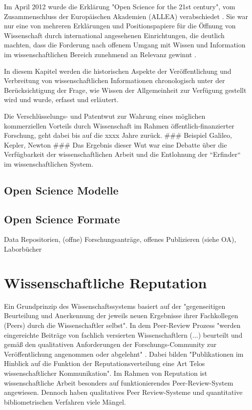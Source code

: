 Im April 2012 wurde die Erklärung "Open Science for the 21st century", vom Zusammenschluss der Europäischen Akademien (ALLEA) verabschiedet \cite{ALLEA_2012}. Sie war nur eine von mehreren Erklärungen und Positionspapiere für die Öffnung von Wissenschaft durch international angesehenen Einrichtungen, die deutlich machten, dass die Forderung nach offenem Umgang mit Wissen und Information im wissenschaftlichen Bereich zunehmend an Relevanz gewinnt \cite{schulze_2013_open}.

In diesem Kapitel werden die historischen Aspekte der Veröffentlichung und Verbreitung von wissenschaftlichen Informationen chronologisch unter der Berücksichtigung der Frage, wie Wissen der Allgemeinheit zur Verfügung gestellt wird und wurde, erfasst und erläutert. 

Die Verschlüsselungs- und Patentwut zur Wahrung eines möglichen kommerziellen Vorteils durch Wissenschaft im Rahmen öffentlich-finanzierter Forschung, geht dabei bis auf die xxxx Jahre zurück. ### Beispiel Galileo, Kepler, Newton ### Das Ergebnis dieser Wut war eine Debatte über die Verfügbarkeit der wissenschaftlichen Arbeit und die Entlohnung der “Erfinder“ im wissenschaftlichen System. 
\subsection{Open Science Modelle}
\subsection{Open Science Formate}
Data Repositorien, (offne) Forschungsanträge, offenes Publizieren (siehe OA), Laborbücher

\section{Wissenschaftliche Reputation}
Ein Grundprinzip des Wissenschaftssystems basiert auf der "gegenseitigen Beurteilung und Anerkennung der jeweils neuen Ergebnisse ihrer Fachkollegen (Peers) durch die Wissenschaftler selbst"\cite{Hanekop_2014}. In dem Peer-Review Prozess "werden eingereichte Beiträge von fachlich versierten Wissenschaftlern (...) beurteilt und gemäß den qualitativen Anforderungen der Forschungs-Community zur Veröffentlichung angenommen oder abgelehnt" \cite{Hess_2006}. Dabei bilden "Publikationen im Hinblick auf die Funktion der Reputationsverteilung eine Art Telos wissenschaftlicher Kommunikation"\cite{hirschauer2004peer}. Im Rahmen von Reputation ist wissenschaftliche Arbeit besonders auf funktionierendes Peer-Review-System angewiesen\cite{suchen}. Dennoch haben qualitatives Peer Review-Systeme und quantitative bibliometrischen Verfahren viele Mängel\cite{osterloh2008anreize}.

